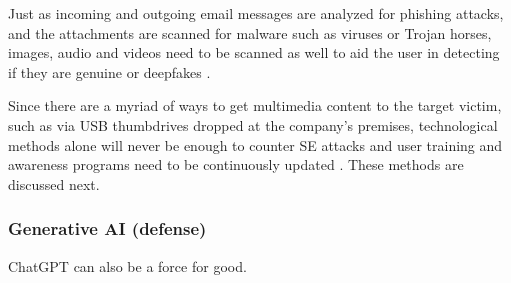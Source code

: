 Just as incoming and outgoing email messages are analyzed for phishing attacks, and the attachments are scanned for malware such as viruses or Trojan horses, images, audio and videos need to be scanned as well to aid the user in detecting if they are genuine or deepfakes \citep{mirskyTheCreationAndDetectionOfDeepfakes2021}.

Since there are a myriad of ways to get multimedia content to the target victim, such as via USB thumbdrives dropped at the company's premises, technological methods alone will never be enough to counter SE attacks and user training and awareness programs need to be continuously updated \citep{hadnagySocialEngineering2018}. These methods are discussed next.

\subsubsection{Generative AI (defense)}
\begin{comment}

Generative AI (ChatGPT etc) for defensive purposes

What to cover:
    - How ChatGPT can find errors in code
    - ChatGPT can generate test cases for code
    - Datan analyysi poikkeamien löytämiseksi?
    
\end{comment}

ChatGPT can also be a force for good.

